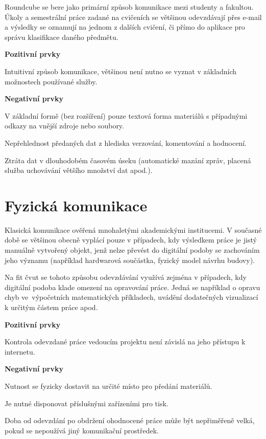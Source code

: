 Roundcube se bere jako primární způsob komunikace mezi studenty a fakultou. Úkoly a semestrální práce zadané na cvičeních se většinou odevzdávají přes e-mail a výsledky se oznamují na jednom z dalších cvičení, či přímo do aplikace pro správu klasifikace daného předmětu.

\textbf{Pozitivní prvky}
\begin{ul}
   \item Intuitivní způsob komunikace, většinou není nutno se vyznat v základních možnostech používané služby.
\end{ul}

\textbf{Negativní prvky}
\begin{ul}
   \item V základní formě (bez rozšíření) pouze textová forma materiálů s případnými odkazy na vnější zdroje nebo soubory.
   \item Nepřehlednost předaných dat z hlediska verzování, komentování a hodnocení.
   \item Ztráta dat v dlouhodobém časovém úseku (automatické mazání zpráv, placená služba uchovávání většího množství dat apod.).
\end{ul}




\section{Fyzická komunikace}

Klasická komunikace ověřená mnohaletými akademickými institucemi. V současné době se většinou obecně vyplácí pouze v případech, kdy výsledkem práce je jistý manuálně vytvořený objekt, jenž nelze převést do digitální podoby se zachováním jeho významu (například hardwarová součástka, fyzický model návrhu budovy).

Na \gls{fit} \gls{čvut} se tohoto způsobu odevzdávání využívá zejména v případech, kdy digitální podoba klade omezení na opravování práce. Jedná se například o opravu chyb ve~výpočetních matematických příkladech, uvádění dodatečných vizualizací k určitým částem práce apod.

\textbf{Pozitivní prvky}
\begin{ul}
   \item Kontrola odevzdané práce vedoucím projektu není závislá na jeho přístupu k internetu.
\end{ul}

\textbf{Negativní prvky}
\begin{ul}
   \item Nutnost se fyzicky dostavit na určité místo pro předání materiálů.
   \item Je nutné disponovat příslušnými zařízeními pro tisk.
   \item Doba od odevzdání po obdržení ohodnocené práce může být nepřiměřeně velká, pokud se nepoužívá jiný komunikační prostředek.
\end{ul}
